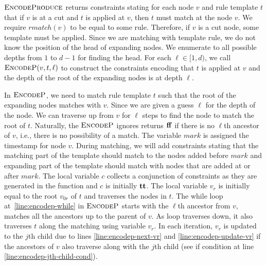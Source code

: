 $\textsc{EncodeProduce}$ returns constraints stating for each node $v$
and rule template $t$ that
if $v$ is at a cut and $t$ is applied at $v$, then $t$ must match
at the node $v$.
We require $rmatch(v)$ to be equal to some rule.
Therefore, if $v$ is a cut node, some template must be applied. 
Since we are matching with template rule, we do not know the
position of the head of expanding nodes.
We enumerate to all possible depths from $1$ to $d-1$ for finding
the head.
For each $\ell \in [1,d)$, we call $\textsc{EncodeP}( v, t, \ell)$
to construct the constraints encoding that $t$ is applied at $v$
and the depth of the root of the expanding nodes is at depth $\ell$.

In $\textsc{EncodeP}$,
we need to match rule template $t$ such that the root of the expanding
nodes matches with $v$.
Since we are given a guess $\ell$ for the depth of the
node.
We can traverse up from $v$ for $\ell$ steps to find the node to match
the root of $t$.
Naturally, the $\textsc{EncodeP}$ ignores returns $\mathbf{ff}$ if there
is no $\ell$th ancestor of $v$, i.e., there is no possibility of a match.
The variable $mark$ is assigned the timestamp for node $v$.
During matching, we will add constraints stating that the matching part of the
template should match to the nodes added before $mark$
and expanding part of the template should match with nodes that
are added at or after $mark$.
The local variable $c$ collects a conjunction of constraints as they are
generated in the function and $c$ is initially $\mathbf{tt}$.
The local variable $v_r$ is initially equal to the root $v_{0r}$ of $t$
and traverses the nodes in $t$.
The while loop at~\ref{line:encodep-while} in $\textsc{EncodeP}$ starts with
the $\ell$th ancestor from $v$,
matches all the ancestors up to the parent of $v$.
As loop traverses down, it also traverses $t$ along the matching
using variable $v_r$.
In each iteration, $v_r$ is updated to the $j$th child due to lines
\ref{line:encodep-next-vr} and \ref{line:encodep-update-vr}
if the ancestors of $v$ also traverse along with the $j$th child
(see if condition at line \ref{line:encodep-jth-child-cond}).

